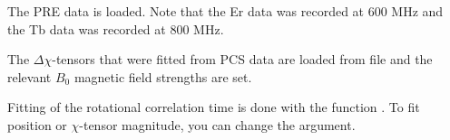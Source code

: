 \documentclass[a4paper,10pt,english,openany,oneside]{sphinxmanual}
\begin{document}
The PRE data is loaded. Note that the Er data was recorded at 600 MHz and the Tb data was recorded at 800 MHz.

%
\begin{sphinxVerbatim}[commandchars=\\\{\}]
  
  
\end{sphinxVerbatim}

The \({\Delta\chi}\)-tensors that were fitted from PCS data are loaded from file and the relevant \({B_0}\) magnetic field strengths are set.

%
\begin{sphinxVerbatim}[commandchars=\\\{\}]
  
  
  
  
\end{sphinxVerbatim}

Fitting of the rotational correlation time is done with the function {\hyperref[\detokenize{reference/generated/paramagpy.fit.nlr_fit_metal_from_pre:paramagpy.fit.nlr_fit_metal_from_pre}]{}}. To fit position or \({\chi}\)-tensor magnitude, you can change the  argument.
\end{document}
